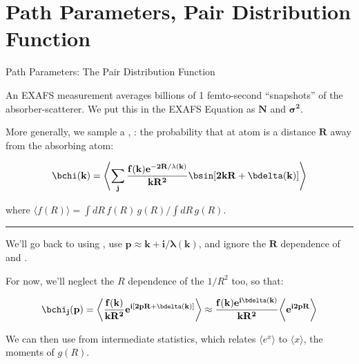 \section{Path Parameters,  Pair Distribution Function}

\begin{slide}{Path Parameters: The Pair Distribution Function}
  \small
  \begin{cenpage}{100mm}\setlength{\baselineskip}{11pt}
    
    \vmm
    
    An EXAFS measurement averages billions of 1 femto-second ``snapshots''
    of the absorber-scatterer.  We put this in the 
    EXAFS Equation as $\mathbf{N}$ and $\mathbf{\sigma^2}$.

    
    \vmm 
    
    More generally, we sample a {}, {} : the probability that at
    atom is a distance ${\mathbf{R}}$ away from the absorbing atom:

    \[  \displaystyle{\mathbf{
        \bchi(k)  = \Biggl\langle \sum_j 
        \frac{f(k)e^{-2R/\lambda(k)}}{kR^2} \bsin[2kR + \bdelta(k)]
        \Biggr\rangle  }}
    \]

    
    where  $  \langle f(R) \rangle = \int dR\, f(R) \, g(R) / \int dR\, g(R) $.

    \vmm \hrule \vmm
    
    We'll go back to using {}, use {$\mathbf{p
        \approx k + i/\lambda(k)}$}, and ignore the $\mathbf{R}$ dependence
    of  and .  

    For now, we'll neglect the $R$ dependence of the $1/R^2$ too, so that:
        
    \[  \displaystyle{\mathbf{
        \bchi_j(p)  = \biggl\langle
        {f(k)\over{kR^2}} e^{i[2pR + \bdelta(k)]}  \biggr\rangle
        \approx  {f(k)e^{i\bdelta(k)}\over{kR^2}} \biggl\langle e^{i2pR}  \biggr\rangle 
      }} 
    \]
    
    \vmm We can then use {} from
    intermediate statistics, which relates $\langle e^x \rangle$ to
    $\langle x \rangle$, the moments of $g(R)$.

  \end{cenpage}
  \vfill
\end{slide} 


